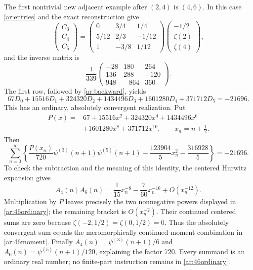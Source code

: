 \documentclass[11pt,a4paper]{article}
\numberwithin{equation}{section}
\theoremstyle{definition}
\theoremstyle{remark}
\newcommand{\C}{\mathbb C}
\begin{document}
The first nontrivial new adjacent example after $(2,4)$ is $(4,6)$.
In this case \eqref{ar:entries} and the exact reconstruction give
\begin{equation}\label{ar:46matrix}
 \begin{pmatrix}C_3\\C_4\\C_5\end{pmatrix}
 =\begin{pmatrix}
 0&3/4&1/4\\5/12&2/3&-1/12\\1&-3/8&1/12
 \end{pmatrix}
 \begin{pmatrix}-1/2\\\zeta(2)\\\zeta(4)\end{pmatrix},
\end{equation}
and the inverse matrix is
\[
 \frac1{339}
 \begin{pmatrix}-28&180&264\\136&288&-120\\948&-864&360\end{pmatrix}.
\]
The first row, followed by \eqref{ar:backward}, yields
\begin{equation}\label{ar:46moment}
 67D_0+15516D_1+324320D_2+1434496D_3
       +1601280D_4+371712D_5=-21696.
\end{equation}
This has an ordinary, absolutely convergent realization. Put
\[
 \begin{split}
 P(x)={}&67+15516x^2+324320x^4+1434496x^6\\
        &+1601280x^8+371712x^{10},\qquad x_n=n+\tfrac12.
 \end{split}
\]
Then
\begin{equation}\label{ar:46ordinary}
 \boxed{\displaystyle
 \sum_{n=0}^{\infty}\left\{
  \frac{P(x_n)}{720}\psi^{(3)}(n+1)\psi^{(5)}(n+1)
       -\frac{123904}{5}x_n^2-\frac{316928}{5}\right\}=-21696.}
\end{equation}
To check the subtraction and the meaning of this identity, the centered
Hurwitz expansion gives
\[
 A_4(n)A_6(n)
   =\frac1{15}x_n^{-8}-\frac7{60}x_n^{-10}+O(x_n^{-12}).
\]
Multiplication by $P$ leaves precisely the two nonnegative powers
displayed in \eqref{ar:46ordinary}; the remaining bracket is
$O(x_n^{-2})$. Their continued centered sums are zero because
$\zeta(-2,1/2)=\zeta(0,1/2)=0$. Thus the absolutely convergent
sum equals the meromorphically continued moment combination in
\eqref{ar:46moment}. Finally
$A_4(n)=\psi^{(3)}(n+1)/6$ and
$A_6(n)=\psi^{(5)}(n+1)/120$, explaining the factor $720$.
Every summand is an ordinary real number; no finite-part instruction
remains in \eqref{ar:46ordinary}.
\end{document}
